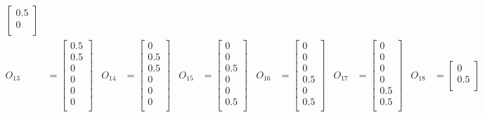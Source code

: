 \documentclass{mitschrift}
\begin{document}
\begin{align}
\begin{bmatrix}
        0.5 \\
        0 \\
    \end{bmatrix} \\
    O_{13} &= \begin{bmatrix}
        0.5 \\
        0.5 \\
        0 \\
        0 \\
        0 \\
        0 \\
    \end{bmatrix} & 
    O_{14} &= \begin{bmatrix}
        0 \\
        0.5 \\
        0.5 \\
        0 \\
        0 \\
        0 \\
    \end{bmatrix} & 
    O_{15} &= \begin{bmatrix}
        0 \\
        0 \\
        0.5 \\
        0 \\
        0 \\
        0.5 \\
    \end{bmatrix} & 
    O_{16} &= \begin{bmatrix}
        0 \\
        0 \\
        0 \\
        0.5 \\
        0 \\
        0.5 \\
    \end{bmatrix} & 
    O_{17} &= \begin{bmatrix}
        0 \\
        0 \\
        0 \\
        0 \\
        0.5 \\
        0.5 \\
    \end{bmatrix} & 
    O_{18} &= \begin{bmatrix}
        0 \\
        0.5 \\

\end{bmatrix}
\end{align}
\end{document}
